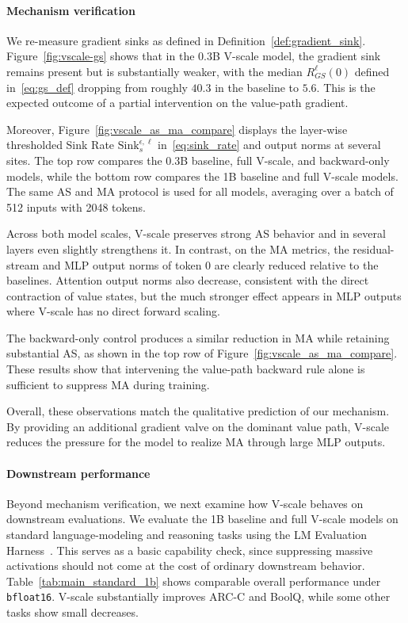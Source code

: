 \documentclass{article}
\theoremstyle{plain}
\theoremstyle{definition}
\theoremstyle{remark}
\begin{document}
\paragraph{Mechanism verification}
We re-measure gradient sinks as defined in Definition~\ref{def:gradient_sink}. Figure~\ref{fig:vscale-gs} shows that in the 0.3B V-scale model, the gradient sink remains present but is substantially weaker, with the median $R_{GS}^{\ell}(0)$ defined in~\eqref{eq:gs_def} dropping from roughly $40.3$ in the baseline to $5.6$. This is the expected outcome of a partial intervention on the value-path gradient.

Moreover, Figure~\ref{fig:vscale_as_ma_compare} displays the layer-wise thresholded Sink Rate $\mathrm{Sink}_s^{\epsilon,\ell}$ in~\eqref{eq:sink_rate} and output norms at several sites. The top row compares the 0.3B baseline, full V-scale, and backward-only models, while the bottom row compares the 1B baseline and full V-scale models. The same AS and MA protocol is used for all models, averaging over a batch of 512 inputs with 2048 tokens.

Across both model scales, V-scale preserves strong AS behavior and in several layers even slightly strengthens it. In contrast, on the MA metrics, the residual-stream and MLP output norms of token 0 are clearly reduced relative to the baselines. Attention output norms also decrease, consistent with the direct contraction of value states, but the much stronger effect appears in MLP outputs where V-scale has no direct forward scaling.

The backward-only control produces a similar reduction in MA while retaining substantial AS, as shown in the top row of Figure~\ref{fig:vscale_as_ma_compare}. These results show that intervening the value-path backward rule alone is sufficient to suppress MA during training.

Overall, these observations match the qualitative prediction of our mechanism. By providing an additional gradient valve on the dominant value path, V-scale reduces the pressure for the model to realize MA through large MLP outputs.

\paragraph{Downstream performance}
Beyond mechanism verification, we next examine how V-scale behaves on downstream evaluations. We evaluate the 1B baseline and full V-scale models on standard language-modeling and reasoning tasks using the LM Evaluation Harness~\cite{eval-harness}. This serves as a basic capability check, since suppressing massive activations should not come at the cost of ordinary downstream behavior. Table~\ref{tab:main_standard_1b} shows comparable overall performance under \texttt{bfloat16}. V-scale substantially improves ARC-C and BoolQ, while some other tasks show small decreases.
\end{document}
